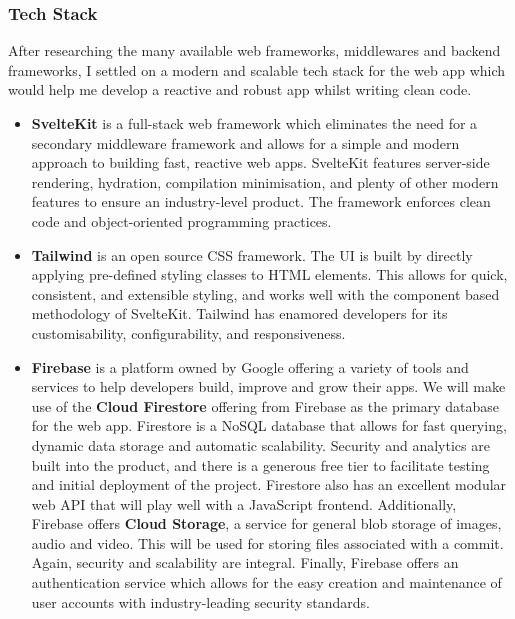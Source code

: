 \documentclass[12pt,a4paper]{article}
\begin{document}
\subsubsection{Tech Stack}
After researching the many available web frameworks, middlewares and backend frameworks, I settled on a modern and scalable tech stack for the web app which would help me develop a reactive and robust app whilst writing clean code.
\begin{itemize}
    \item \textbf{SvelteKit} is a full-stack web framework which eliminates the need for a secondary middleware framework and allows for a simple and modern approach to building fast, reactive web apps. SvelteKit features server-side rendering, hydration, compilation minimisation, and plenty of other modern features to ensure an industry-level product. The framework enforces clean code and object-oriented programming practices. 
    \item \textbf{Tailwind} is an open source CSS framework. The UI is built by directly applying pre-defined styling classes to HTML elements. This allows for quick, consistent, and extensible styling, and works well with the component based methodology of SvelteKit. Tailwind has enamored developers for its customisability, configurability, and responsiveness.
    \item \textbf{Firebase} is a platform owned by Google offering a variety of tools and services to help developers build, improve and grow their apps. We will make use of the \textbf{Cloud Firestore} offering from Firebase as the primary database for the web app. Firestore is a NoSQL database that allows for fast querying, dynamic data storage and automatic scalability. Security and analytics are built into the product, and there is a generous free tier to facilitate testing and initial deployment of the project. Firestore also has an excellent modular web API that will play well with a JavaScript frontend. Additionally, Firebase offers \textbf{Cloud Storage}, a service for general blob storage of images, audio and video. This will be used for storing files associated with a commit. Again, security and scalability are integral. Finally, Firebase offers an authentication service which allows for the easy creation and maintenance of user accounts with industry-leading security standards.
\end{itemize}
\end{document}
